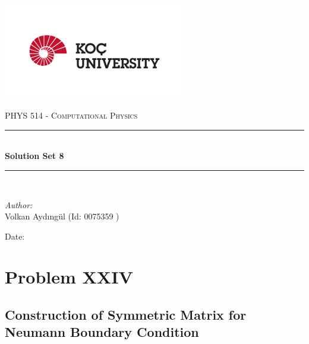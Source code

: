 \documentclass[letterpaper,12pt]{article}
\newcommand{\reporttitle}{Solution Set 8}
\newcommand{\reportauthor}{ Volkan Aydıngül (Id: 0075359 )\\
                            }
\begin{document}
\begin{titlepage}
\newcommand{\HRule}{\rule{0.7\linewidth}{0.5mm}}
\begin{center} %
\includegraphics[width = 8cm]{figures/koc_logo.png}

\textsc{\Large PHYS 514 - Computational Physics}\\[1.5cm] 
\HRule \\[0.6cm]
{ \huge \bfseries \reporttitle}\\ %
\HRule \\[1.5cm]
\end{center}
\vspace{2cm}
\begin{flushleft} \large
\textit{Author:}\\
\reportauthor%
\end{flushleft}
\vspace{2cm}
\makeatletter
Date: \@date 
\vfill %
\makeatother
\end{titlepage}




\tableofcontents
\newpage







\section{Problem XXIV}
\subsection{Construction of Symmetric Matrix for Neumann Boundary Condition}
\end{document}

